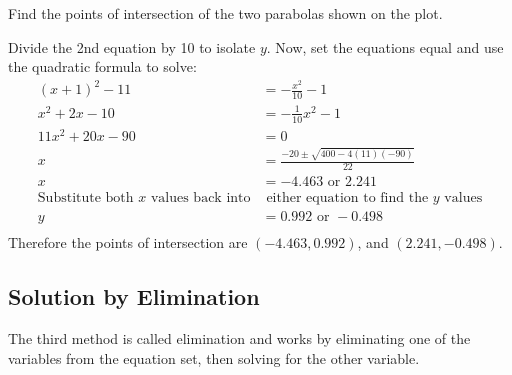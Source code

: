  \examq Find the points of intersection of the two parabolas shown on the plot.
 \begin{center}
 \end{center}
 \solution Divide the 2nd equation by 10 to isolate $y$. Now, set the equations equal and use the quadratic formula to solve:
 \begin{align*}
 (x+1)^2-11&=-\frac{x^2}{10}-1\tag{set eq1=eq2}\\
 x^2+2x-10&=-\frac{1}{10}x^2-1\tag{expand the brackets}\\
 11x^2+20x-90&=0\tag{collect like terms}\\
 x&=\frac{-20\pm\sqrt{400-4(11)(-90)}}{22}\\
 x&=-4.463 \mbox{ or }2.241\\
 \text{Substitute both }x\text{ values back into}& \text{ either equation to find the }y\text{ values}\\
 y&=0.992 \mbox{ or } -0.498\\
 \end{align*}
 Therefore the points of intersection are $(-4.463,0.992)$, and $(2.241,-0.498)$.

\subsection*{Solution by Elimination}
The third method is called elimination and works by eliminating one of the variables from the equation set, then solving for the other variable.

